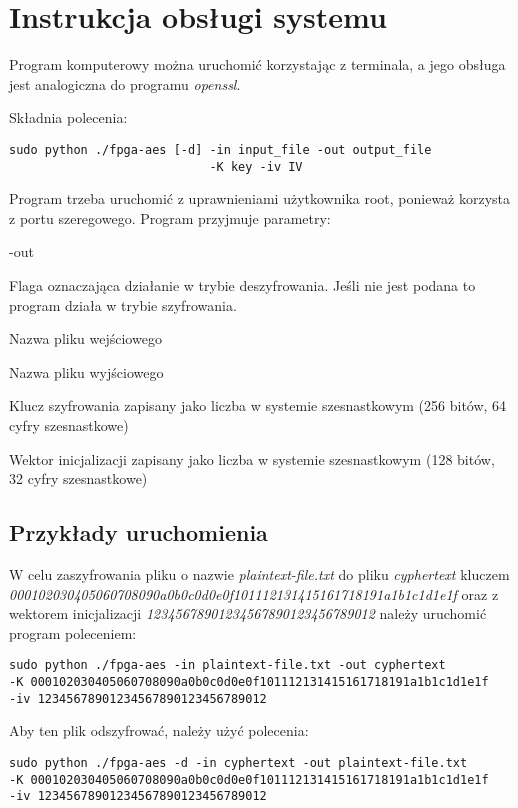 \section{Instrukcja obsługi systemu}
Program komputerowy można uruchomić korzystając z terminala, a jego obsługa jest analogiczna do programu \textit{openssl}.

Składnia polecenia:
\begin{verbatim}
sudo python ./fpga-aes [-d] -in input_file -out output_file 
                            -K key -iv IV
\end{verbatim}

Program trzeba uruchomić z uprawnieniami użytkownika root, ponieważ korzysta z portu szeregowego. Program przyjmuje parametry:
\begin{interface}{-out}
\item[\textbf{-d}]Flaga oznaczająca działanie w trybie deszyfrowania. Jeśli nie jest podana to program działa w trybie szyfrowania.
\item[\textbf{-in}]Nazwa pliku wejściowego
\item[\textbf{-out}]Nazwa pliku wyjściowego
\item[\textbf{-K}]Klucz szyfrowania zapisany jako liczba w systemie szesnastkowym (256 bitów, 64 cyfry szesnastkowe)
\item[\textbf{-iv}]Wektor inicjalizacji zapisany jako liczba w systemie szesnastkowym (128 bitów, 32 cyfry szesnastkowe)
\end{interface}

\subsection{Przykłady uruchomienia}
W celu zaszyfrowania pliku o nazwie \textit{plaintext-file.txt} do pliku \textit{cyphertext} kluczem \textit{000102030405060708090a0b0c0d0e0f101112131415161718191a1b1c1d1e1f} oraz z wektorem inicjalizacji \textit{12345678901234567890123456789012} należy uruchomić program poleceniem:

\begin{verbatim}
sudo python ./fpga-aes -in plaintext-file.txt -out cyphertext 
-K 000102030405060708090a0b0c0d0e0f101112131415161718191a1b1c1d1e1f 
-iv 12345678901234567890123456789012
\end{verbatim}

Aby ten plik odszyfrować, należy użyć polecenia:

\begin{verbatim}
sudo python ./fpga-aes -d -in cyphertext -out plaintext-file.txt 
-K 000102030405060708090a0b0c0d0e0f101112131415161718191a1b1c1d1e1f 
-iv 12345678901234567890123456789012
\end{verbatim}